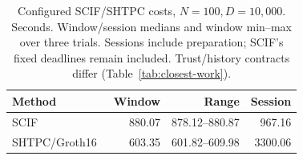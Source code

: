 \begin{table}[t]
\centering
\caption{Configured SCIF/SHTPC costs, \(N=100,D=10{,}000\). Seconds.
Window/session medians and window min--max over three trials. Sessions
include preparation; SCIF's fixed deadlines remain included.
Trust/history contracts differ (Table~\ref{tab:closest-work}).}
\label{tab:scale-final-costs}
\footnotesize
\setlength{\tabcolsep}{3pt}
\begin{tabularx}{\columnwidth}{@{}Yrrr@{}}
\toprule
Method & Window & Range & Session \\
\midrule
SCIF~\cite{Su2025SCIF} & 880.07 & 878.12--880.87 & 967.16 \\
SHTPC/Groth16~\cite{Groth2016pairing} & 603.35 & 601.82--609.98 & 3300.06 \\
\bottomrule
\end{tabularx}
\end{table}

